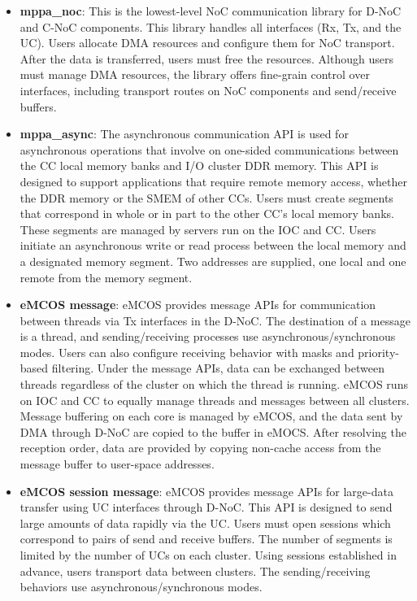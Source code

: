 \begin{itemize}
  \setlength{\leftskip}{-5mm}
  \item \textbf{mppa\_noc}: This is the lowest-level NoC communication library for D-NoC and C-NoC components.
  This library handles all interfaces (Rx, Tx, and the UC).
  Users allocate DMA resources and configure them for NoC transport.
  After the data is transferred, users must free the resources.
  Although users must manage DMA resources, the library offers fine-grain control over interfaces, including transport routes on NoC components and send/receive buffers.
  \item \textbf{mppa\_async}: The asynchronous communication API is used for asynchronous operations that involve on one-sided communications between the CC local memory banks and I/O cluster DDR memory. 
  This API is designed to support applications that require remote memory access, whether the DDR memory or the SMEM of other CCs.
  Users must create segments that correspond in whole or in part to the other CC's local memory banks.
  These segments are managed by servers run on the IOC and CC.
  Users initiate an asynchronous write or read process between the local memory and a designated memory segment.
  Two addresses are supplied, one local and one remote from the memory segment.
  \item \textbf{eMCOS message}: eMCOS provides message APIs for communication between threads via Tx interfaces in the D-NoC.
  The destination of a message is a thread, and sending/receiving processes use asynchronous/synchronous modes.
  Users can also configure receiving behavior with masks and priority-based filtering.
  Under the message APIs, data can be exchanged between threads regardless of the cluster on which the thread is running.
  eMCOS runs on IOC and CC to equally manage threads and messages between all clusters.
  Message buffering on each core is managed by eMCOS, and the data sent by DMA through D-NoC are copied to the buffer in eMOCS.
  After resolving the reception order, data are provided by copying non-cache access from the message buffer to user-space addresses.
  \item \textbf{eMCOS session message}: eMCOS provides message APIs for large-data transfer using UC interfaces through D-NoC.
  This API is designed to send large amounts of data rapidly via the UC.
  Users must open sessions which correspond to pairs of send and receive buffers.
  The number of segments is limited by the number of UCs on each cluster.
  Using sessions established in advance, users transport data between clusters.
  The sending/receiving behaviors use asynchronous/synchronous modes.
\end{itemize}


